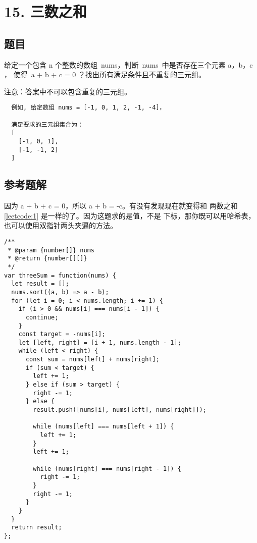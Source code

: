 \newpage
\section{15. 三数之和}
\label{leetcode:15}

\subsection{题目}

给定一个包含 n 个整数的数组 nums，判断 nums 中是否存在三个元素 a，b，c ，
使得 a + b + c = 0 ？找出所有满足条件且不重复的三元组。

注意：答案中不可以包含重复的三元组。

\begin{verbatim}
  例如, 给定数组 nums = [-1, 0, 1, 2, -1, -4]，

  满足要求的三元组集合为：
  [
    [-1, 0, 1],
    [-1, -1, 2]
  ]
\end{verbatim}

\subsection{参考题解}

因为 a + b + c = 0，所以 a + b = -c。有没有发现现在就变得和
两数之和 \ref{leetcode:1} 是一样的了。因为这题求的是值，不是
下标，那你既可以用哈希表，也可以使用双指针两头夹逼的方法。

\begin{verbatim}
/**
 * @param {number[]} nums
 * @return {number[][]}
 */
var threeSum = function(nums) {
  let result = [];
  nums.sort((a, b) => a - b);
  for (let i = 0; i < nums.length; i += 1) {
    if (i > 0 && nums[i] === nums[i - 1]) {
      continue;
    }
    const target = -nums[i];
    let [left, right] = [i + 1, nums.length - 1];
    while (left < right) {
      const sum = nums[left] + nums[right];
      if (sum < target) {
        left += 1;
      } else if (sum > target) {
        right -= 1;
      } else {
        result.push([nums[i], nums[left], nums[right]]);

        while (nums[left] === nums[left + 1]) {
          left += 1;
        }
        left += 1;

        while (nums[right] === nums[right - 1]) {
          right -= 1;
        }
        right -= 1;
      }
    }
  }
  return result;
};
\end{verbatim}
